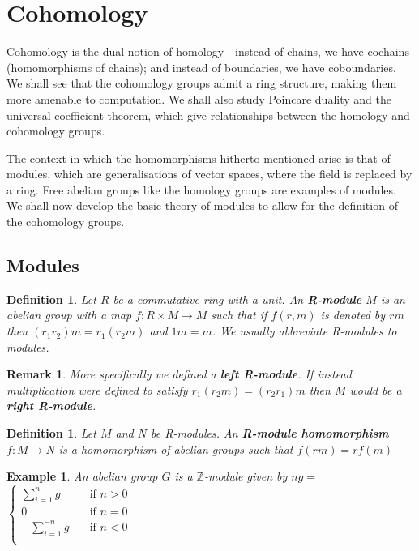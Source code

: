 \documentclass{article}
\newtheorem{definition}[theorem]{Definition}
\newtheorem{example}[theorem]{Example}
\newtheorem{remark}[theorem]{Remark}
\begin{document}
\section{Cohomology}
Cohomology is the dual notion of homology - instead of chains, we have cochains (homomorphisms of chains); and instead of boundaries, we have coboundaries. We shall see that the cohomology groups admit a ring structure, making them more amenable to computation. We shall also study Poincare duality and the universal coefficient theorem, which give relationships between the homology and cohomology groups.

The context in which the homomorphisms hitherto mentioned arise is that of modules, which are generalisations of vector spaces, where the field is replaced by a ring. Free abelian groups like the homology groups are examples of modules. We shall now develop the basic theory of modules to allow for the definition of the cohomology groups.
\subsection{Modules}
\begin{definition}
Let $R$ be a commutative ring with a unit. An \textbf{R-module} $M$ is an abelian group with a map $f\colon R\times M\to M$ such that if $f(r,m)$ is denoted by $rm$ then $(r_1r_2)m=r_1(r_2m)$ and $1m=m$. We usually abbreviate R-modules to modules.
\end{definition}
\begin{remark}
More specifically we defined a \textbf{left R-module}. If instead multiplication were defined to satisfy $r_1(r_2m)=(r_2r_1)m$ then $M$ would be a \textbf{right R-module}.
\end{remark}

\begin{definition}
Let $M$ and $N$ be R-modules. An \textbf{R-module homomorphism} $f\colon M\to N$ is a homomorphism of abelian groups such that $f(rm)=rf(m)$ 
\end{definition}

\begin{example}
An abelian group $G$ is a $\mathbb{Z}$-module given by $ng=$$\begin{cases}
       \sum_{i=1}^ng &\quad\text{if }n>0 \\
       0 &\quad\text{if }n=0 \\
       -\sum_{i=1}^{-n}g &\quad\text{if }n<0 \\
     \end{cases}$\\
\end{example}
\end{document}
